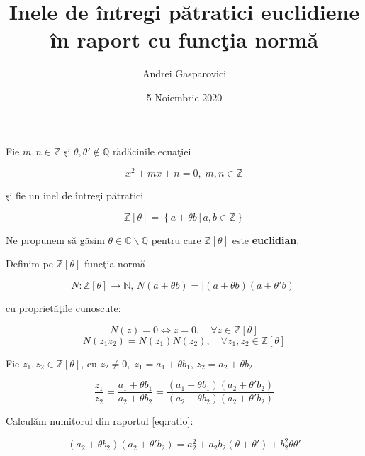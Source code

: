 \documentclass[12pt]{article}
\title{Inele de întregi pătratici euclidiene în raport cu funcţia normă}
\author{Andrei Gasparovici}
\date{5 Noiembrie 2020}
\begin{document}
\maketitle

Fie $m, n \in \mathbb{Z}$ şi $\theta, \theta' \notin \mathbb{Q}$ rădăcinile ecuaţiei

\begin{equation} \label{eq:def_theta}
    x^2 + mx + n = 0, \; m, n \in \mathbb{Z}
\end{equation}

şi fie un inel de întregi pătratici %

\begin{equation} \label{eq:def_z_theta}
    \mathbb{Z}[\theta] = \left\{ a + \theta b \,|\, a, b \in \mathbb{Z}\right\}
\end{equation}

\vspace{.4cm}
Ne propunem să găsim $\theta \in \mathbb{C} \backslash \mathbb{Q}$ pentru care $\mathbb{Z}[\theta]$ este \textbf{euclidian}.
\vspace{.4cm}

Definim pe $\mathbb{Z[\theta]}$ funcţia normă

\begin{equation} \label{eq:def_norm}
    N : \mathbb{Z[\theta]} \to \mathbb{N}, \, N(a + \theta b) = |(a + \theta b)(a + \theta' b)|
\end{equation}

cu proprietăţile cunoscute:

\begin{equation}
N(z) = 0 \Leftrightarrow z = 0, \quad \forall z \in \mathbb{Z}[\theta]
\end{equation}
\begin{equation}
N(z_1 z_2) = N(z_1)N(z_2), \quad \forall z_1, z_2 \in \mathbb{Z}[\theta]
\end{equation}

Fie $z_1, z_2 \in \mathbb{Z}[\theta]$, cu $z_2 \neq 0, \; z_1 = a_1 + \theta b_1$, $z_2 = a_2 + \theta b_2$.

\begin{equation} \label{eq:ratio}
    \frac{z_1}{z_2} = \frac{a_1 + \theta b_1}{a_2 + \theta b_2} = 
    \frac{(a_1 + \theta b_1)(a_2 + \theta' b_2)}{(a_2 + \theta b_2)(a_2 + \theta' b_2)}
\end{equation}

Calculăm numitorul din raportul \eqref{eq:ratio}:

\begin{equation} \label{eq:ratio_denominator}
    (a_2 + \theta b_2)(a_2 + \theta' b_2) = a_2^2 + a_2b_2(\theta + \theta') + b_2^2\theta\theta'
\end{equation}
\end{document}
